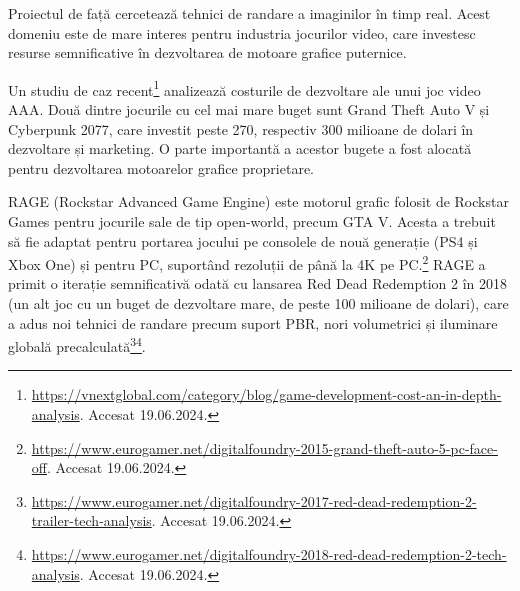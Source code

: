 \documentclass[12pt,a4paper]{report}
\numberwithin{equation}{section} %
\begin{document}
Proiectul de față cercetează tehnici de randare a imaginilor în timp real. Acest
domeniu este de mare interes pentru industria jocurilor video, care investesc
resurse semnificative în dezvoltarea de motoare grafice puternice.

Un studiu de caz
recent\footnote{\label{vnextglobal}\url{https://vnextglobal.com/category/blog/game-development-cost-an-in-depth-analysis}. Accesat 19.06.2024.}
analizează costurile de dezvoltare ale unui joc video AAA. Două dintre jocurile
cu cel mai mare buget sunt Grand Theft Auto V și Cyberpunk 2077, care investit
peste 270, respectiv 300 milioane de dolari în dezvoltare și marketing. O parte
importantă a acestor bugete a fost alocată pentru dezvoltarea motoarelor grafice
proprietare.

RAGE (Rockstar Advanced Game Engine) este motorul grafic folosit
de Rockstar Games pentru jocurile sale de tip open-world, precum GTA V. Acesta a
trebuit să fie adaptat pentru portarea jocului pe consolele de nouă generație
(PS4 și Xbox One) și pentru PC, suportând rezoluții de până la 4K pe PC.\footnote{\url{https://www.eurogamer.net/digitalfoundry-2015-grand-theft-auto-5-pc-face-off}. Accesat 19.06.2024.}
RAGE a primit o iterație semnificativă odată cu lansarea Red Dead Redemption 2 în 2018
(un alt joc cu un buget de dezvoltare mare, de peste 100 milioane de dolari),
care a adus noi tehnici de randare precum suport PBR, nori volumetrici și iluminare globală
precalculată\footnote{\url{https://www.eurogamer.net/digitalfoundry-2017-red-dead-redemption-2-trailer-tech-analysis}. Accesat 19.06.2024.}\footnote{\url{https://www.eurogamer.net/digitalfoundry-2018-red-dead-redemption-2-tech-analysis}. Accesat 19.06.2024.}.
\end{document}
